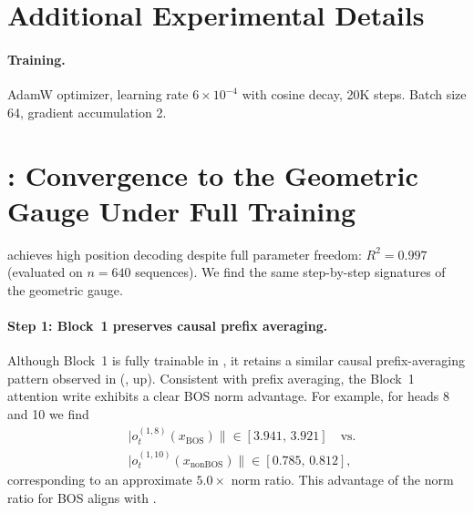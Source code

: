 \documentclass{article}
\theoremstyle{plain}
\theoremstyle{definition}
\theoremstyle{remark}
\begin{document}



\clearpage

\appendix

\section{Additional Experimental Details}
\label{app:details}

\paragraph{Training.}
AdamW optimizer, learning rate $6\times10^{-4}$ with cosine decay, 20K steps.
Batch size 64, gradient accumulation 2.


\section{\modelfull: Convergence to the Geometric Gauge Under Full Training}
\label{app:full_evidence_app}

\modelfull achieves high position decoding despite full parameter freedom: $R^2=0.997$ (evaluated on $n=640$ sequences).
We find the same step-by-step signatures of the geometric gauge.

\paragraph{Step 1: Block~1 preserves causal prefix averaging.}
Although Block~1 is fully trainable in \modelfull, it retains a similar causal prefix-averaging pattern observed in \modelminimal (, up).
Consistent with prefix averaging, the Block~1 attention write exhibits a clear BOS norm advantage.
For example, for heads 8 and 10 we find
\begin{align*}
&|o^{(1,8)}_t(x_{\text{BOS}})\| \in [3.941,\,3.921]
\quad\text{vs.}\\
&|o^{(1,10)}_t(x_{\text{nonBOS}})\| \in [0.785,\,0.812],
\end{align*}
corresponding to an approximate $5.0\times$ norm ratio.
This advantage of the norm ratio for BOS aligns with \modelminimal.
\end{document}
